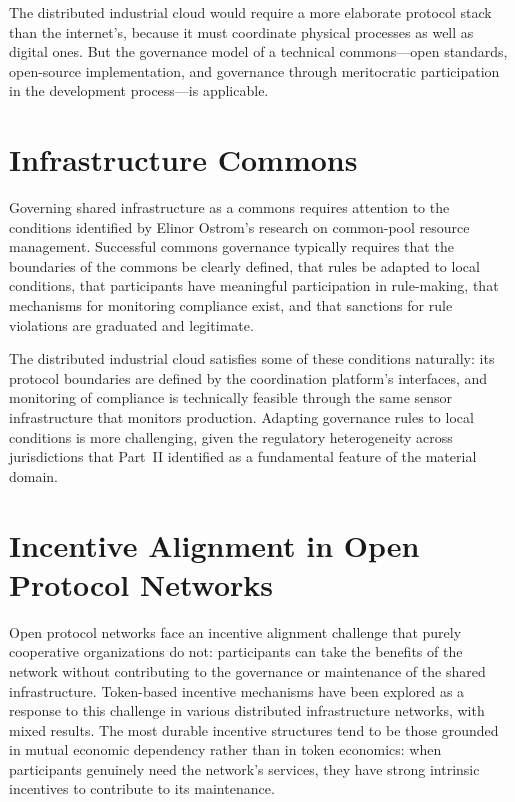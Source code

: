 \documentclass[12pt]{book}
\theoremstyle{definition}
\theoremstyle{remark}
\begin{document}
The distributed industrial cloud would require a more elaborate
protocol stack than the internet's, because it must coordinate
physical processes as well as digital ones. But the governance model
of a technical commons---open standards, open-source implementation,
and governance through meritocratic participation in the development
process---is applicable.

\section{Infrastructure Commons}

Governing shared infrastructure as a commons requires attention to
the conditions identified by Elinor Ostrom's research on common-pool
resource management. Successful commons governance typically requires
that the boundaries of the commons be clearly defined, that rules be
adapted to local conditions, that participants have meaningful
participation in rule-making, that mechanisms for monitoring
compliance exist, and that sanctions for rule violations are
graduated and legitimate.

The distributed industrial cloud satisfies some of these conditions
naturally: its protocol boundaries are defined by the coordination
platform's interfaces, and monitoring of compliance is technically
feasible through the same sensor infrastructure that monitors
production. Adapting governance rules to local conditions is more
challenging, given the regulatory heterogeneity across jurisdictions
that Part~II identified as a fundamental feature of the material
domain.

\section{Incentive Alignment in Open Protocol Networks}

Open protocol networks face an incentive alignment challenge that
purely cooperative organizations do not: participants can take the
benefits of the network without contributing to the governance or
maintenance of the shared infrastructure. Token-based incentive
mechanisms have been explored as a response to this challenge in
various distributed infrastructure networks, with mixed results.
The most durable incentive structures tend to be those grounded in
mutual economic dependency rather than in token economics: when
participants genuinely need the network's services, they have strong
intrinsic incentives to contribute to its maintenance.
\end{document}
